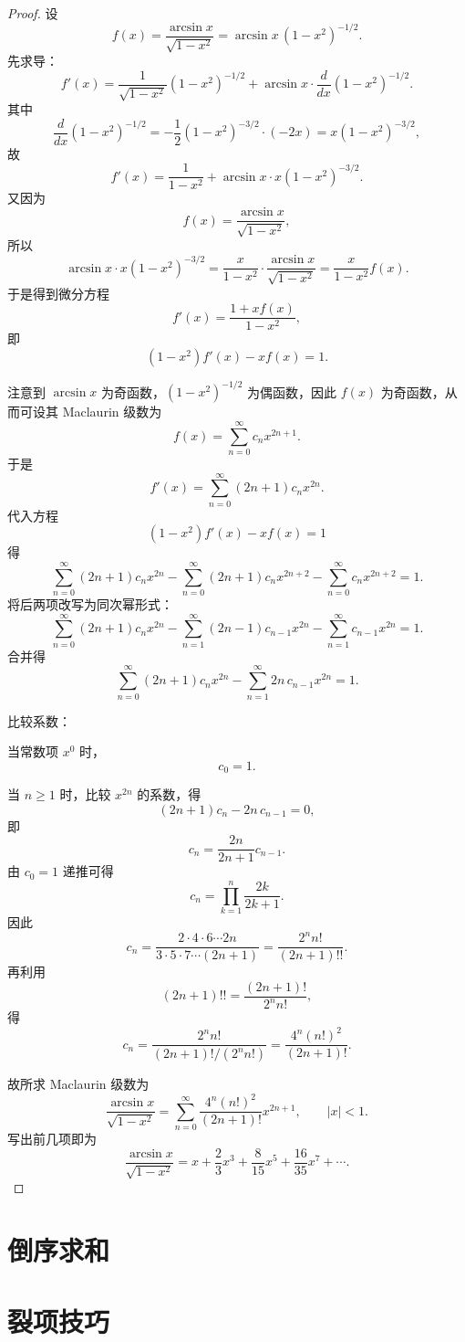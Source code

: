 \begin{proof}
设
\[
f(x)=\frac{\arcsin x}{\sqrt{1-x^2}}=\arcsin x\,(1-x^2)^{-1/2}.
\]
先求导：
\[
f'(x)=\frac{1}{\sqrt{1-x^2}}(1-x^2)^{-1/2}+\arcsin x\cdot \frac{d}{dx}(1-x^2)^{-1/2}.
\]
其中
\[
\frac{d}{dx}(1-x^2)^{-1/2}
=-\frac12(1-x^2)^{-3/2}\cdot(-2x)
=x(1-x^2)^{-3/2},
\]
故
\[
f'(x)=\frac{1}{1-x^2}+\arcsin x\cdot x(1-x^2)^{-3/2}.
\]
又因为
\[
f(x)=\frac{\arcsin x}{\sqrt{1-x^2}},
\]
所以
\[
\arcsin x\cdot x(1-x^2)^{-3/2}
=\frac{x}{1-x^2}\cdot \frac{\arcsin x}{\sqrt{1-x^2}}
=\frac{x}{1-x^2}f(x).
\]
于是得到微分方程
\[
f'(x)=\frac{1+x f(x)}{1-x^2},
\]
即
\[
(1-x^2)f'(x)-x f(x)=1.
\]

注意到 \(\arcsin x\) 为奇函数，\((1-x^2)^{-1/2}\) 为偶函数，因此 \(f(x)\) 为奇函数，从而可设其 Maclaurin 级数为
\[
f(x)=\sum_{n=0}^\infty c_n x^{2n+1}.
\]
于是
\[
f'(x)=\sum_{n=0}^\infty (2n+1)c_n x^{2n}.
\]
代入方程
\[
(1-x^2)f'(x)-x f(x)=1
\]
得
\[
\sum_{n=0}^\infty (2n+1)c_n x^{2n}
-\sum_{n=0}^\infty (2n+1)c_n x^{2n+2}
-\sum_{n=0}^\infty c_n x^{2n+2}
=1.
\]
将后两项改写为同次幂形式：
\[
\sum_{n=0}^\infty (2n+1)c_n x^{2n}
-\sum_{n=1}^\infty (2n-1)c_{n-1}x^{2n}
-\sum_{n=1}^\infty c_{n-1}x^{2n}
=1.
\]
合并得
\[
\sum_{n=0}^\infty (2n+1)c_n x^{2n}
-\sum_{n=1}^\infty 2n\,c_{n-1}x^{2n}
=1.
\]

比较系数：

当常数项 \(x^0\) 时，
\[
c_0=1.
\]

当 \(n\ge 1\) 时，比较 \(x^{2n}\) 的系数，得
\[
(2n+1)c_n-2n\,c_{n-1}=0,
\]
即
\[
c_n=\frac{2n}{2n+1}c_{n-1}.
\]
由 \(c_0=1\) 递推可得
\[
c_n=\prod_{k=1}^n \frac{2k}{2k+1}.
\]
因此
\[
c_n=\frac{2\cdot4\cdot6\cdots 2n}{3\cdot5\cdot7\cdots (2n+1)}
=\frac{2^n n!}{(2n+1)!!}.
\]
再利用
\[
(2n+1)!!=\frac{(2n+1)!}{2^n n!},
\]
得
\[
c_n=\frac{2^n n!}{(2n+1)!/(2^n n!)}
=\frac{4^n(n!)^2}{(2n+1)!}.
\]

故所求 Maclaurin 级数为
\[
\frac{\arcsin x}{\sqrt{1-x^2}}
=\sum_{n=0}^\infty \frac{4^n(n!)^2}{(2n+1)!}x^{2n+1},
\qquad |x|<1.
\]
写出前几项即为
\[
\frac{\arcsin x}{\sqrt{1-x^2}}
=x+\frac23x^3+\frac8{15}x^5+\frac{16}{35}x^7+\cdots.
\]
\end{proof}


\section{倒序求和}

\section{裂项技巧}

